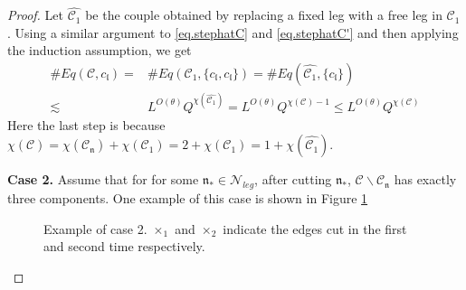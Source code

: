 \begin{proof}
    Let $\widehat{\mathcal{C}_1}$ be the couple obtained by replacing a fixed leg with a free leg in $\mathcal{C}_1$. Using a similar argument to \eqref{eq.stephatC} and \eqref{eq.stephatC'} and then applying the induction assumption, we get
    \begin{equation}\label{eq.case1.2expand'}
    \begin{split}
     \#Eq(\mathcal{C},c_{\mathfrak{l}})=&\#Eq(\mathcal{C}_1, \{c_{\mathfrak{l}}, c_{\mathfrak{l}}\})=\#Eq(\widehat{\mathcal{C}_1}, \{c_{\mathfrak{l}}\})
     \\
     \lesssim& L^{O(\theta)} Q^{\chi(\widehat{\mathcal{C}_1})}=L^{O(\theta)} Q^{\chi(\mathcal{C})-1}\le L^{O(\theta)} Q^{\chi(\mathcal{C})}
    \end{split}
    \end{equation}
    Here the last step is because $\chi(\mathcal{C})=\chi(\mathcal{C}_{\mathfrak{n}})+\chi(\mathcal{C}_1)=2+\chi(\mathcal{C}_1)=1+\chi(\widehat{\mathcal{C}_1})$.
    
    \textbf{Case 2.} Assume that for for some $\mathfrak{n}_*\in \mathcal{N}_{leg}$, after cutting $\mathfrak{n}_*$, $\mathcal{C}\backslash \mathcal{C}_{\mathfrak{n}}$ has exactly three components. One example of this case is shown in Figure \ref{fig.examplecase2}
    \begin{figure}[H]
     \centering
     \caption{Example of case 2. $\times_1$ and $\times_2$ indicate the edges cut in the first and second time respectively.}
     \label{fig.examplecase2}
    \end{figure}
    

\end{proof}
